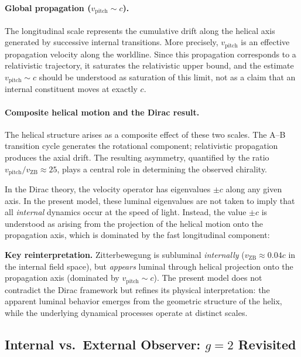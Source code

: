 \documentclass[12pt,letterpaper]{article}
\newcommand{\vZB}{v_{\mathrm{ZB}}}
\begin{document}
\paragraph{Global propagation ($v_{\mathrm{pitch}} \sim c$).}
The longitudinal scale represents the cumulative drift along the helical axis generated
by successive internal transitions. More precisely, $v_{\mathrm{pitch}}$ is an effective
propagation velocity along the worldline. Since this propagation corresponds to a
relativistic trajectory, it saturates the relativistic upper bound, and the estimate
$v_{\mathrm{pitch}}\sim c$ should be understood as saturation of this limit, not as a
claim that an internal constituent moves at exactly $c$.

\paragraph{Composite helical motion and the Dirac result.}
The helical structure arises as a composite effect of these two scales. The A--B
transition cycle generates the rotational component; relativistic propagation produces
the axial drift. The resulting asymmetry, quantified by the ratio
$v_{\mathrm{pitch}}/\vZB \approx 25$, plays a central role in determining the
observed chirality.

In the Dirac theory, the velocity operator has eigenvalues $\pm c$ along any given axis.
In the present model, these luminal eigenvalues are not taken to imply that all
\emph{internal} dynamics occur at the speed of light. Instead, the value $\pm c$
is understood as arising from the projection of the helical motion onto the propagation
axis, which is dominated by the fast longitudinal component:

\begin{mdframed}[style=purplebox]
\textbf{Key reinterpretation.}
Zitterbewegung is subluminal \emph{internally}
($\vZB \approx 0.04c$ in the internal field space),
but \emph{appears} luminal through helical projection onto the propagation axis
(dominated by $v_{\mathrm{pitch}}\sim c$).
The present model does not contradict the Dirac framework but refines its
physical interpretation: the apparent luminal behavior emerges from the
geometric structure of the helix, while the underlying dynamical processes
operate at distinct scales.
\end{mdframed}

\subsection{\texorpdfstring{Internal vs.\ External Observer: $g=2$ Revisited}{Internal vs.\ External Observer: g=2 Revisited}}
\label{subsec:observers}
\end{document}
